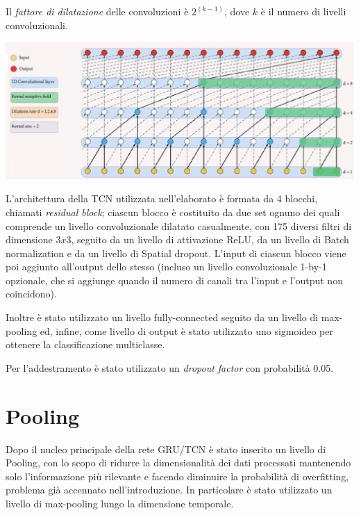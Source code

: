 Il \textit{fattore di dilatazione} delle convoluzioni è $2^{(k-1)}$, dove $k$ è il numero di livelli convoluzionali.

\vspace{0.25cm} 
\begin{center}
	\includegraphics[scale=0.7]{images/esempio_tcn_dilatation.eps}
	\label{Figura 1.}
\end{center}
\vspace{0.25cm}

L'architettura della TCN utilizzata nell'elaborato è formata da 4 blocchi, chiamati \textit{residual block}; ciascun blocco è costituito da due set ognuno dei quali comprende un livello convoluzionale dilatato casualmente, con 175 diversi filtri di dimensione $3x3$, seguito da un livello di attivazione ReLU, da un livello di Batch normalization e da un livello di Spatial dropout. L'input di ciascun blocco viene poi aggiunto all'output dello stesso (incluso un livello convoluzionale 1-by-1 opzionale, che si aggiunge quando il numero di canali tra l'input e l'output non coincidono).

Inoltre è stato utilizzato un livello fully-connected seguito da un livello di max-pooling ed, infine, come livello di output è stato utilizzato uno sigmoideo per ottenere la classificazione multiclasse.

Per l'addestramento è stato utilizzato un \textit{dropout factor} con probabilità 0.05.

\section{Pooling}
Dopo il nucleo principale della rete GRU/TCN è stato inserito un livello di Pooling, con lo scopo di ridurre la dimensionalità dei dati processati mantenendo solo l'informazione più rilevante e facendo diminuire la probabilità di overfitting, problema già accennato nell'introduzione. In particolare è stato utilizzato un livello di max-pooling lungo la dimensione temporale.

